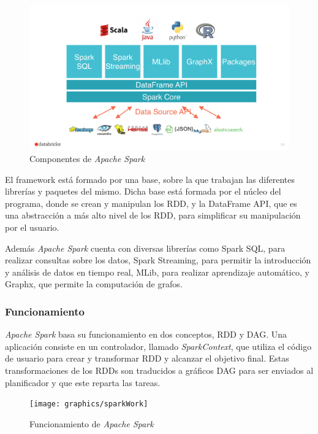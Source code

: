 \begin{figure}[htp!]
	\centering
	\caption{Componentes de \textit{Apache Spark} \cite{partsSpark}}
	\label{partSpark}
	\vspace{5pt}
	\includegraphics[scale=0.31]{graphics/partSpark}
\end{figure}

El \gls{framework} está formado por una base, sobre la que trabajan las diferentes librerías y paquetes del mismo. Dicha base está formada por el núcleo del programa, donde se crean y manipulan los \gls{RDD}, y la DataFrame API, que es una abstracción a más alto nivel de los \gls{RDD}, para simplificar su manipulación por el usuario.

Además \textit{Apache Spark} cuenta con diversas librerías como Spark SQL, para realizar consultas sobre los datos, Spark Streaming, para permitir la introducción y análisis de datos en tiempo real, MLib, para realizar aprendizaje automático, y Graphx, que permite la computación de grafos.

\subsubsection{Funcionamiento}
\textit{Apache Spark} basa su funcionamiento en dos conceptos, \gls{RDD} y \gls{DAG}. Una aplicación consiste en un controlador, llamado \textit{SparkContext}, que utiliza el código de usuario para crear y transformar \gls{RDD} y alcanzar el objetivo final. Estas transformaciones de los \gls{RDD}s son traducidos a gráficos \gls{DAG} para ser enviados al planificador y que este reparta las tareas.

\begin{figure}[htp!]
	\centering
	\caption{Funcionamiento de \textit{Apache Spark} \cite{partsSpark}}
	\label{sparkWork}
	\vspace{5pt}
	\texttt{[image: graphics/sparkWork]}
\end{figure}

